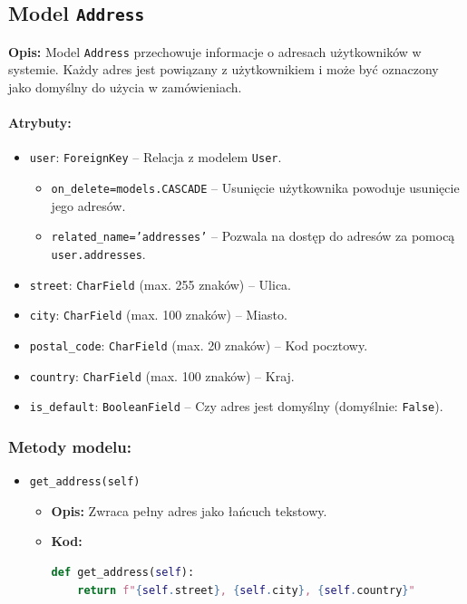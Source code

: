 \documentclass[12pt,a4paper,oneside]{article}
\theoremstyle{definition}
\numberwithin{equation}{section}
\begin{document}
%
%
\subsection{Model \texttt{Address}}

\textbf{Opis:}  
Model \texttt{Address} przechowuje informacje o adresach użytkowników w systemie. Każdy adres jest powiązany z użytkownikiem i może być oznaczony jako domyślny do użycia w zamówieniach.

\paragraph{Atrybuty:}
\begin{itemize}
    \item \texttt{user}: \texttt{ForeignKey} – Relacja z modelem \texttt{User}.
    \begin{itemize}
        \item \texttt{on\_delete=models.CASCADE} – Usunięcie użytkownika powoduje usunięcie jego adresów.
        \item \texttt{related\_name='addresses'} – Pozwala na dostęp do adresów za pomocą \texttt{user.addresses}.
    \end{itemize}
    \item \texttt{street}: \texttt{CharField} (max. 255 znaków) – Ulica.
    \item \texttt{city}: \texttt{CharField} (max. 100 znaków) – Miasto.
    \item \texttt{postal\_code}: \texttt{CharField} (max. 20 znaków) – Kod pocztowy.
    \item \texttt{country}: \texttt{CharField} (max. 100 znaków) – Kraj.
    \item \texttt{is\_default}: \texttt{BooleanField} – Czy adres jest domyślny (domyślnie: \texttt{False}).
\end{itemize}

\subsubsection{Metody modelu:}
\begin{itemize}
    \item \texttt{get\_address(self)}  
        \begin{itemize}
            \item \textbf{Opis:} Zwraca pełny adres jako łańcuch tekstowy.
            \item \textbf{Kod:}
            \begin{lstlisting}[language=Python, caption=Metoda \texttt{get\_address}]
def get_address(self):
    return f"{self.street}, {self.city}, {self.country}"
            \end{lstlisting}
        \end{itemize}
\end{itemize}
\end{document}
